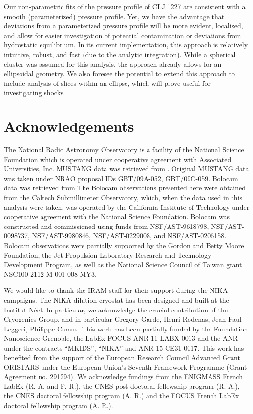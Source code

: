 \documentclass[twocolumn,traditabstract]{aa}
\begin{document}
Our non-parametric fits of the pressure profile of CLJ 1227 are consistent with a smooth (parameterized) pressure profile.
Yet, we have the advantage that deviations from a parameterized pressure profile will be more evident, localized, and
allow for easier investigation of potential contamination or deviations from hydrostatic equilibrium. In its current implementation,
this approach is relatively intuitive, robust, and fast (due to the analytic integration). While a spherical cluster was assumed
for this analysis, the approach already allows for an ellipsoidal geometry. We also foresee the potential to extend this approach
to include analysis of slices within an ellipse, which will prove useful for investigating shocks.

\section*{Acknowledgements}

The National Radio Astronomy Observatory is a facility of the National Science Foundation which is operated
under cooperative agreement with Associated Universities, Inc. MUSTANG data was retrieved from
\href{https://safe.nrao.edu/wiki/bin/view/GB/Pennarray/MUSTANG_CLASH}. Original MUSTANG data was
taken under NRAO proposal IDs GBT/09A-052, GBT/09C-059. Bolocam data was retrieved from
\href{http://irsa.ipac.caltech.edu/data/Planck/release\_2/ancillary-data/bolocam/}
The Bolocam observations presented here were obtained from the Caltech Submillimeter Observatory, which,
when the data used in this analysis were taken, was operated by the California Institute of Technology under
cooperative agreement with the National Science Foundation. Bolocam was constructed and commissioned using funds
from NSF/AST-9618798, NSF/AST-0098737, NSF/AST-9980846, NSF/AST-0229008, and NSF/AST-0206158. Bolocam observations
were partially supported by the Gordon and Betty Moore Foundation, the Jet Propulsion Laboratory Research and
Technology Development Program, as well as the National Science Council of Taiwan grant NSC100-2112-M-001-008-MY3.

We would like to thank the IRAM staff for their support during the NIKA campaigns. 
The NIKA dilution cryostat has been designed and built at the Institut N\'eel. 
In particular, we acknowledge the crucial contribution of the Cryogenics Group, and 
in particular Gregory Garde, Henri Rodenas, Jean Paul Leggeri, Philippe Camus. 
This work has been partially funded by the Foundation Nanoscience Grenoble, the LabEx FOCUS ANR-11-LABX-0013 and 
the ANR under the contracts ``MKIDS'', ``NIKA'' and ANR-15-CE31-0017. 
This work has benefited from the support of the European Research Council Advanced Grant ORISTARS 
under the European Union's Seventh Framework Programme (Grant Agreement no. 291294).
We acknowledge fundings from the ENIGMASS French LabEx (R. A. and F. R.), 
the CNES post-doctoral fellowship program (R. A.), the CNES doctoral fellowship program (A. R.) and 
the FOCUS French LabEx doctoral fellowship program (A. R.).
\end{document}
